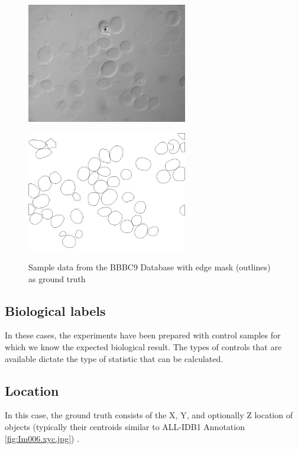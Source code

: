 \begin{figure}[H]
\begin{minipage}[c]{0.4\linewidth}
\centering
\includegraphics[width=70mm]{../images/48hr-001-DIC.jpg}
\label{fig:BBBC009_img}
\end{minipage}
\hfill
\begin{minipage}[c]{0.4\linewidth}
\centering
\includegraphics[width=70mm]{../images/48hr-001-DIC_.jpg}
\label{fig:BBBC009_O}
\end{minipage}
\caption{Sample data from the BBBC9 Database with edge mask (outlines) as ground truth}
\end{figure}

\subsection{Biological labels}
\hspace{\parindent}
In these cases, the experiments have been prepared with control samples for which we know the expected biological result. The types of controls that are available dictate the type of statistic that can be calculated.

\subsection{Location}
\hspace{\parindent}
In this case, the ground truth consists of the X, Y, and optionally Z location of objects (typically their centroids similar to ALL-IDB1 Annotation \ref{fig:Im006.xyc.jpg}) .

